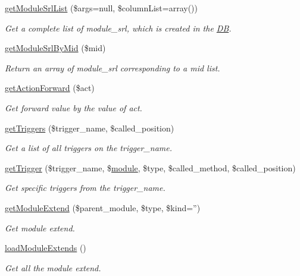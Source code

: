 \begin{DoxyCompactItemize}
\hyperlink{classmoduleModel_ae63e7e551002fac4c01a330a76dd7244}{get\+Module\+Srl\+List} (\$args=null, \$column\+List=array())
\begin{DoxyCompactList}\small\item\em Get a complete list of module\+\_\+srl, which is created in the \hyperlink{classDB}{D\+B}. \end{DoxyCompactList}\item 
\hyperlink{classmoduleModel_a857a241844d60b7678bd144175d23f29}{get\+Module\+Srl\+By\+Mid} (\$mid)
\begin{DoxyCompactList}\small\item\em Return an array of module\+\_\+srl corresponding to a mid list. \end{DoxyCompactList}\item 
\hyperlink{classmoduleModel_a2a06b59fa663c1e79f81aac571e2e5c8}{get\+Action\+Forward} (\$act)
\begin{DoxyCompactList}\small\item\em Get forward value by the value of act. \end{DoxyCompactList}\item 
\hyperlink{classmoduleModel_a979238a3b59bf52ccaa29ec3f7744808}{get\+Triggers} (\$trigger\+\_\+name, \$called\+\_\+position)
\begin{DoxyCompactList}\small\item\em Get a list of all triggers on the trigger\+\_\+name. \end{DoxyCompactList}\item 
\hyperlink{classmoduleModel_ae570716b47c7fd19b7fc0d217a155b22}{get\+Trigger} (\$trigger\+\_\+name, \$\hyperlink{classmodule}{module}, \$type, \$called\+\_\+method, \$called\+\_\+position)
\begin{DoxyCompactList}\small\item\em Get specific triggers from the trigger\+\_\+name. \end{DoxyCompactList}\item 
\hyperlink{classmoduleModel_a1dd3c03b874a4f6e05f6b5e8ec283665}{get\+Module\+Extend} (\$parent\+\_\+module, \$type, \$kind='')
\begin{DoxyCompactList}\small\item\em Get module extend. \end{DoxyCompactList}\item 
\hyperlink{classmoduleModel_adfde81ebf0fcb2814ba49ad23ce803ff}{load\+Module\+Extends} ()
\begin{DoxyCompactList}\small\item\em Get all the module extend. \end{DoxyCompactList}\item 

\end{DoxyCompactItemize}
